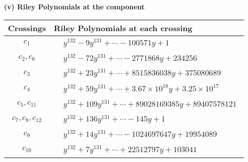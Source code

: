 \documentclass[1p]{elsarticle_modified}
\theoremstyle{definition}
\begin{document}
\newpage\renewcommand{\arraystretch}{1}
\flushleft \textbf{(v) Riley Polynomials at the component}\newline \\
\begin{tabular}{m{50pt}|m{274pt}}
Crossings & \hspace{64pt}Riley Polynomials at each crossing \\
\hline $$\begin{aligned}c_{1}\end{aligned}$$&$\begin{aligned}
&y^{132}-9 y^{131}+\cdots-100571 y+1
\end{aligned}$\\
\hline $$\begin{aligned}c_{2},c_{6}\end{aligned}$$&$\begin{aligned}
&y^{132}-72 y^{131}+\cdots-2771868 y+234256
\end{aligned}$\\
\hline $$\begin{aligned}c_{3}\end{aligned}$$&$\begin{aligned}
&y^{132}+23 y^{131}+\cdots+8515836038 y+375080689
\end{aligned}$\\
\hline $$\begin{aligned}c_{4}\end{aligned}$$&$\begin{aligned}
&y^{132}+59 y^{131}+\cdots+3.67\times10^{18} y+3.25\times10^{17}
\end{aligned}$\\
\hline $$\begin{aligned}c_{5},c_{11}\end{aligned}$$&$\begin{aligned}
&y^{132}+109 y^{131}+\cdots+89028169385 y+89407578121
\end{aligned}$\\
\hline $$\begin{aligned}c_{7},c_{8},c_{12}\end{aligned}$$&$\begin{aligned}
&y^{132}+136 y^{131}+\cdots-145 y+1
\end{aligned}$\\
\hline $$\begin{aligned}c_{9}\end{aligned}$$&$\begin{aligned}
&y^{132}+14 y^{131}+\cdots-1024697647 y+19954089
\end{aligned}$\\
\hline $$\begin{aligned}c_{10}\end{aligned}$$&$\begin{aligned}
&y^{132}+7 y^{131}+\cdots+22512797 y+103041
\end{aligned}$\\
\hline
\end{tabular}\\~\\
\end{document}
